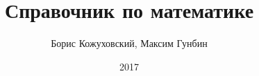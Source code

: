 \documentclass[a4paper,12pt]{report}
\begin{document}
\author{Борис Кожуховский, Максим Гунбин}
\title{Справочник по математике}
\date{2017}

\maketitle
\tableofcontents















\printindex %
\end{document}
